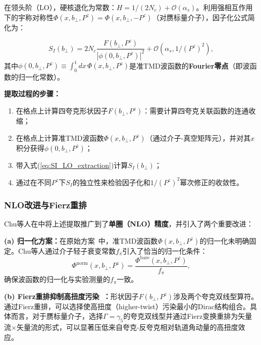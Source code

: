 \documentclass[12pt,a4paper]{ctexart}
\theoremstyle{definition}
\begin{document}
在领头阶（LO），硬核退化为常数：$H = 1/(2N_c) + \mathcal{O}(\alpha_s)$。利用强相互作用下的宇称对称性$\Phi(x, b_\perp, P^z) = \Phi(x, b_\perp, -P^z)$（对赝标量介子），因子化公式简化为：

\begin{equation}
\boxed{S_I(b_\perp) = 2N_c \frac{F(b_\perp, P^z)}{|\phi(0, b_\perp, P^z)|^2} + \mathcal{O}(\alpha_s, 1/(P^z)^2)},
\label{eq:SI_LO_extraction}
\end{equation}
其中$\phi(0, b_\perp, P^z) \equiv \int_0^1 dx\, \Phi(x, b_\perp, P^z)$是准TMD波函数的\textbf{Fourier零点}（即波函数的归一化常数）。

\textbf{提取过程的步骤：}
\begin{enumerate}
    \item 在格点上计算四夸克形状因子$F(b_\perp, P^z)$：需要计算四夸克关联函数的连通收缩；
    \item 在格点上计算准TMD波函数$\Phi(x, b_\perp, P^z)$（通过介子-真空矩阵元），并对其$x$积分获得$\phi(0, b_\perp, P^z)$；
    \item 带入式(\ref{eq:SI_LO_extraction})计算$S_I(b_\perp)$；
    \item 通过在不同$P^z$下$S_I$的独立性来检验因子化和$1/(P^z)^2$幂次修正的收敛性。
\end{enumerate}

\subsubsection{NLO改进与Fierz重排}

Chu等人在\cite{Chu2023soft}中将上述提取推广到了\textbf{单圈（NLO）精度}，并引入了两个重要改进：

\textbf{(a) 归一化方案：}在原始方案~\cite{LPC2020soft}中，准TMD波函数$\Phi(x, b_\perp, P^z)$的归一化未明确固定。Chu等人通过介子轻子衰变常数$f_\pi$引入了恰当的归一化条件：
\begin{equation}
\Phi^{\text{norm}}(x, b_\perp, P^z) = \frac{\Phi^{\text{bare}}(x, b_\perp, P^z)}{f_\pi},
\end{equation}
确保波函数的归一化与实验测量的$f_\pi$一致。

\textbf{(b) Fierz重排抑制高扭度污染~\cite{Chu2023soft}：}形状因子$F(b_\perp, P^z)$涉及两个夸克双线型算符。通过Fierz重排，可以选择使高扭度（higher-twist）污染最小的Dirac结构组合。具体而言，对于赝标量介子，选择$\Gamma = \gamma_5$的夸克双线型并通过Fierz变换重排为矢量流$\times$矢量流的形式，可以显著压低来自夸克-反夸克相对轨道角动量的高扭度效应。
\end{document}
